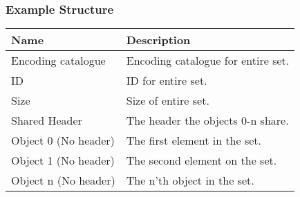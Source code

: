 \documentclass[11pt]{article}
\begin{document}
\subsubsection{Example Structure}

\begin{center}
\begin{tabular}{ |l|l| } 
\hline
\textbf{Name} & \textbf{Description}\\
\hline
Encoding catalogue & Encoding catalogue for entire set. \\  
ID & ID for entire set. \\  
Size & Size of entire set. \\  
Shared Header & The header the objects 0-n share. \\ 
Object 0 (No header) & The first element in the set. \\ 
Object 1 (No header) & The second element on the set. \\ 
Object n (No header) & The n'th object in the set. \\ 
\hline
\end{tabular}
\end{center}
\end{document}
